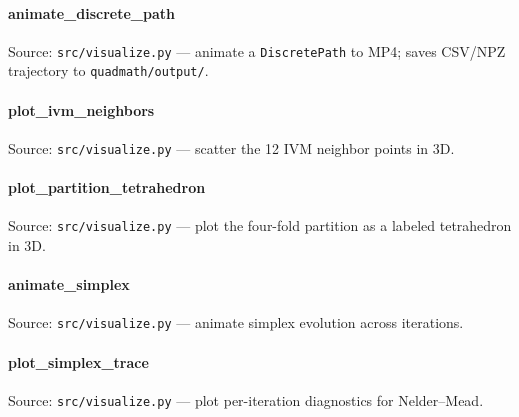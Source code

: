 \documentclass[
  10pt,
]{article}
\newcommand{\passthrough}[1]{#1}
\renewcommand{\texttt}[1]{%
    \colorbox{codebg}{\color{codefg}\ttfamily #1}%
}
\begin{document}
\hypertarget{code:animate_discrete_path}{%
\paragraph{\texorpdfstring{\texttt{animate\_discrete\_path}}{animate\_discrete\_path}}\label{code:animate_discrete_path}}

Source: \passthrough{\lstinline!src/visualize.py!} --- animate a
\passthrough{\lstinline!DiscretePath!} to MP4; saves CSV/NPZ trajectory
to \passthrough{\lstinline!quadmath/output/!}.

\hypertarget{code:plot_ivm_neighbors}{%
\paragraph{\texorpdfstring{\texttt{plot\_ivm\_neighbors}}{plot\_ivm\_neighbors}}\label{code:plot_ivm_neighbors}}

Source: \passthrough{\lstinline!src/visualize.py!} --- scatter the 12
IVM neighbor points in 3D.

\hypertarget{code:plot_partition_tetrahedron}{%
\paragraph{\texorpdfstring{\texttt{plot\_partition\_tetrahedron}}{plot\_partition\_tetrahedron}}\label{code:plot_partition_tetrahedron}}

Source: \passthrough{\lstinline!src/visualize.py!} --- plot the
four-fold partition as a labeled tetrahedron in 3D.

\hypertarget{code:animate_simplex}{%
\paragraph{\texorpdfstring{\texttt{animate\_simplex}}{animate\_simplex}}\label{code:animate_simplex}}

Source: \passthrough{\lstinline!src/visualize.py!} --- animate simplex
evolution across iterations.

\hypertarget{code:plot_simplex_trace}{%
\paragraph{\texorpdfstring{\texttt{plot\_simplex\_trace}}{plot\_simplex\_trace}}\label{code:plot_simplex_trace}}

Source: \passthrough{\lstinline!src/visualize.py!} --- plot
per-iteration diagnostics for Nelder--Mead.
\end{document}
